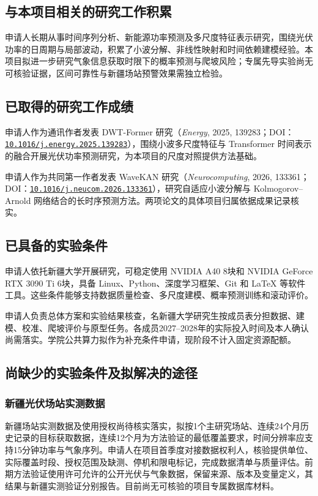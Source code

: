 \subsection{与本项目相关的研究工作积累}
申请人长期从事时间序列分析、新能源功率预测及多尺度特征表示研究，围绕光伏功率的日周期与局部波动，积累了小波分解、非线性映射和时间依赖建模经验。本项目拟进一步研究气象信息获取时限下的概率预测与爬坡风险；专属先导实验尚无可核验证据，区间可靠性与新疆场站预警效果需独立检验。

\subsection{已取得的研究工作成绩}
申请人作为通讯作者发表 DWT-Former 研究（\textit{Energy}, 2025, 139283；DOI：\href{https://doi.org/10.1016/j.energy.2025.139283}{\nolinkurl{10.1016/j.energy.2025.139283}}）\cite{sun2025dwt}，围绕小波多尺度特征与 Transformer 时间表示的融合开展光伏功率预测研究，为本项目的尺度对照提供方法基础。

申请人作为共同第一作者发表 WaveKAN 研究（\textit{Neurocomputing}, 2026, 133361；DOI：\href{https://doi.org/10.1016/j.neucom.2026.133361}{\nolinkurl{10.1016/j.neucom.2026.133361}}）\cite{liu2026wavekan}，研究自适应小波分解与 Kolmogorov--Arnold 网络结合的长时序预测方法。两项论文的具体项目归属依据成果记录核实。

\subsection{已具备的实验条件}
申请人依托新疆大学开展研究，可稳定使用 NVIDIA A40 8块和 NVIDIA GeForce RTX 3090 Ti 6块，具备 Linux、Python、深度学习框架、Git 和 LaTeX 等软件工具。这些条件能够支持数据质量检查、多尺度建模、概率预测训练和滚动评价。

申请人负责总体方案和实验结果核查，名新疆大学研究生按成员表分担数据、建模、校准、爬坡评价与原型任务。各成员2027--2028年的实际投入时间及本人确认尚需落实。学院公共算力拟作为补充条件申请，现阶段不计入固定资源配额。

\subsection{尚缺少的实验条件及拟解决的途径}
\subsubsection{新疆光伏场站实测数据}
新疆场站实测数据及使用授权尚待核实落实，拟按1个主研究场站、连续24个月历史记录的目标获取数据，连续12个月为方法验证的最低覆盖要求，时间分辨率应支持15分钟功率与气象序列。申请人在项目首季度对接数据权利人，核验提供单位、实际覆盖时段、授权范围及缺测、停机和限电标记，完成数据清单与质量评估。前期方法验证使用许可允许的公开光伏与气象数据，保留来源、版本及变量定义，其结果与新疆实测验证分别报告。目前尚无可核验的项目专属数据库材料。

